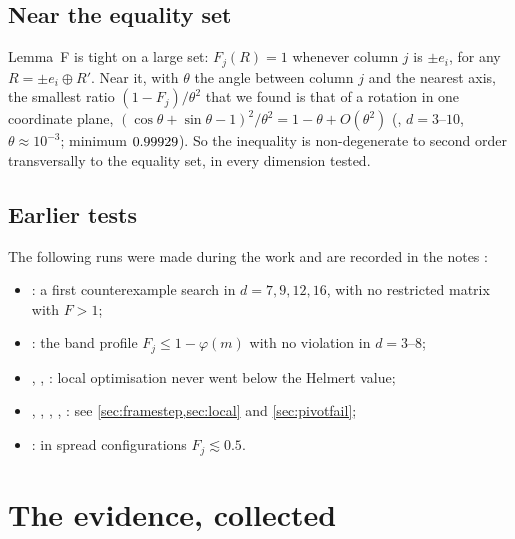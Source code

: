 \documentclass[11pt,a4paper]{article}
\begin{document}
\subsection{Near the equality set}
Lemma~F is tight on a large set: $F_j(R)=1$ whenever column $j$ is $\pm e_i$, for any $R=\pm e_i\oplus R'$. Near it, with $\theta$ the angle between column $j$ and the nearest axis, the smallest ratio $(1-F_j)/\theta^2$ that we found is that of a rotation in one coordinate plane, $(\cos\theta+\sin\theta-1)^2/\theta^2=1-\theta+O(\theta^2)$ (, $d=3$--$10$, $\theta\approx10^{-3}$; minimum $0.99929$). So the inequality is non-degenerate to second order transversally to the equality set, in every dimension tested.

\subsection{Earlier tests}
The following runs were made during the work and are recorded in the notes :
\begin{itemize}
\item {}: a first counterexample search in $d=7,9,12,16$, with no restricted matrix with $F>1$;
\item {}: the band profile $F_j\le1-\varphi(m)$ with no violation in $d=3$--$8$;
\item {}, , : local optimisation never went below the Helmert value;
\item {}, , , , : see \cref{sec:framestep,sec:local} and \cref{sec:pivotfail};
\item {}: in spread configurations $F_j\lesssim0.5$.
\end{itemize}

\section{The evidence, collected}\label{sec:evidence}
\end{document}
